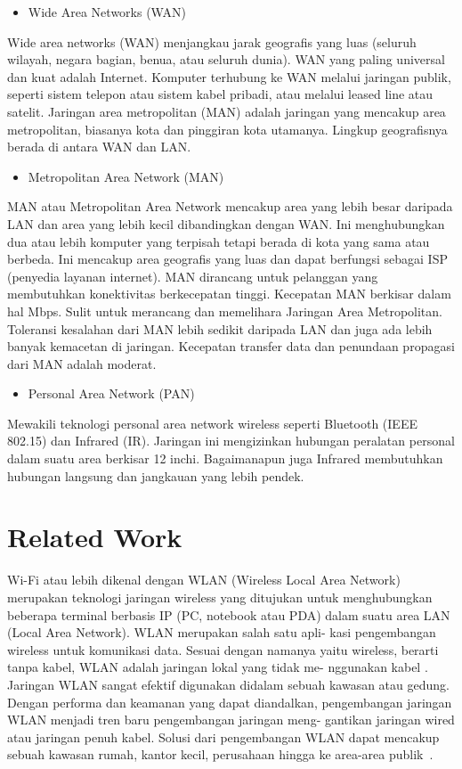 \documentclass[conference]{IEEEtran}
\begin{document}
\begin{itemize}
    \item Wide Area Networks (WAN)
\end{itemize}
Wide area networks (WAN) menjangkau jarak geografis yang luas (seluruh wilayah, negara bagian, benua, atau seluruh dunia). 
WAN yang paling universal dan kuat adalah Internet.
Komputer terhubung ke WAN melalui jaringan publik, seperti sistem telepon atau sistem kabel pribadi, atau melalui leased line atau satelit. 
Jaringan area metropolitan (MAN) adalah jaringan yang mencakup area metropolitan, biasanya kota dan pinggiran kota utamanya. 
Lingkup geografisnya berada di antara WAN dan LAN.

\begin{itemize}
    \item Metropolitan Area Network (MAN)
\end{itemize}
MAN atau Metropolitan Area Network mencakup area yang lebih besar daripada LAN dan area yang lebih kecil dibandingkan dengan WAN.
Ini menghubungkan dua atau lebih komputer yang terpisah tetapi berada di kota yang sama atau berbeda. 
Ini mencakup area geografis yang luas dan dapat berfungsi sebagai ISP (penyedia layanan internet).
MAN dirancang untuk pelanggan yang membutuhkan konektivitas berkecepatan tinggi.
Kecepatan MAN berkisar dalam hal Mbps. Sulit untuk merancang dan memelihara Jaringan Area Metropolitan. 
Toleransi kesalahan dari MAN lebih sedikit daripada LAN dan juga ada lebih banyak kemacetan di jaringan.
Kecepatan transfer data dan penundaan propagasi dari MAN adalah moderat.

\begin{itemize}
    \item Personal Area Network (PAN)
\end{itemize}
Mewakili teknologi personal area network wireless seperti Bluetooth (IEEE 802.15) dan Infrared (IR). 
Jaringan ini mengizinkan hubungan peralatan personal dalam suatu area berkisar 12 inchi. 
Bagaimanapun juga Infrared membutuhkan hubungan langsung dan jangkauan yang lebih pendek.

\section{Related Work}
Wi-Fi atau lebih dikenal dengan
WLAN (Wireless Local Area Network) merupakan
teknologi jaringan wireless yang ditujukan untuk
menghubungkan beberapa terminal berbasis IP (PC,
notebook atau PDA) dalam suatu area LAN (Local
Area Network). WLAN merupakan salah satu apli-
kasi pengembangan wireless untuk komunikasi data.
Sesuai dengan namanya yaitu wireless, berarti tanpa
kabel, WLAN adalah jaringan lokal yang tidak me-
nggunakan kabel . Jaringan WLAN
sangat efektif digunakan didalam sebuah kawasan
atau gedung. Dengan performa dan keamanan yang
dapat diandalkan, pengembangan jaringan WLAN
menjadi tren baru pengembangan jaringan meng-
gantikan jaringan wired atau jaringan penuh kabel.
Solusi dari pengembangan WLAN dapat mencakup
sebuah kawasan rumah, kantor kecil, perusahaan
hingga ke area-area publik~. 
\end{document}
